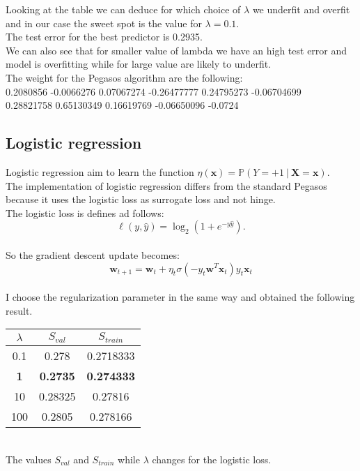 Looking at the table we can deduce for which choice of $\lambda$ we underfit and overfit and in our case the sweet spot is the value for $\lambda = 0.1$.\\
The test error for the best predictor is 0.2935.\\
We can also see that for smaller value of lambda we have an high test error and model is overfitting while for large value are likely to underfit.\\
The weight for the Pegasos algorithm are the following: \\
0.2080856  -0.0066276   0.07067274 -0.26477777  0.24795273 -0.06704699\\
0.28821758  0.65130349  0.16619769 -0.06650096 -0.0724

\subsection{Logistic regression}
Logistic regression aim to learn the function $\eta(\boldsymbol{x}) = \mathbb{P}(Y = +1\ |\ \textbf{X} = \boldsymbol{x})$.\\
The implementation of logistic regression differs from the standard Pegasos because it uses the logistic loss as surrogate loss and not hinge.\\
The logistic loss is defines ad follows: $$\ell(y, \hat{y}) = \log_2 (1+e^{-y\hat{y}}).$$\\
So the gradient descent update becomes: $$\boldsymbol{w}_{t+1} = \boldsymbol{w}_t + \eta_t \sigma(-y_t \boldsymbol{w}^T \boldsymbol{x}_t) y_t \boldsymbol{x}_t$$\\
I choose the regularization parameter in the same way and obtained the following result.\\
\begin{center}
    \begin{tabular}{| c | c | c |}
        \hline
        $\lambda$ & $S_{val}$ & $S_{train}$ \\
        \hline
        0.1 & 0.278 & 0.2718333 \\
        \hline
        \textbf{1} & \textbf{0.2735} & \textbf{0.274333} \\
        \hline
        10 & 0.28325 & 0.27816 \\
        \hline
        100 & 0.2805 & 0.278166 \\
        \hline
    \end{tabular}
    \\
    The values $S_{val}$ and $S_{train}$ while $\lambda$ changes for the logistic loss.\\
\end{center}

